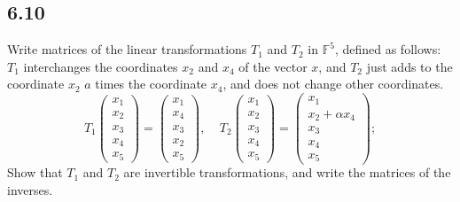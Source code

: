\documentclass{amsart}
\begin{document}
\subsection*{6.10} Write matrices of the linear transformations $T_1$ and $T_2$ in $\mathbb{F}^5$, defined as follows: $T_1$ interchanges the coordinates $x_2$ and $x_4$ of the vector $x$, and $T_2$ just adds to the coordinate $x_2$  $a$ times the coordinate $x_4$, and does not change other coordinates.
\[    T_1 \begin{pmatrix} x_1 \\ x_2 \\ x_3 \\ x_4 \\ x_5 \end{pmatrix} = \begin{pmatrix} x_1 \\ x_4 \\ x_3 \\ x_2 \\ x_5 \end{pmatrix}, \ \ \ \ \ T_2 \begin{pmatrix} x_1 \\ x_2 \\ x_3 \\ x_4 \\ x_5 \end{pmatrix} = \begin{pmatrix} x_1 \\ x_2 + \alpha x_4 \\ x_3 \\ x_4 \\ x_5 \end{pmatrix}                 ;    \]
Show that $T_1$ and $T_2$ are invertible transformations, and write the matrices of the inverses.
\end{document}
